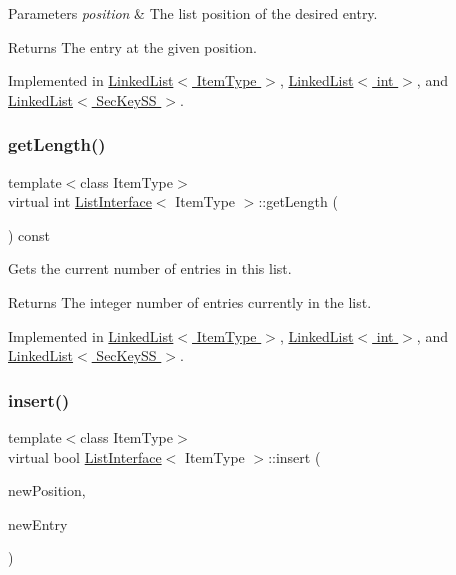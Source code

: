 \begin{DoxyParams}{Parameters}
{\em position} & The list position of the desired entry. \\
\hline
\end{DoxyParams}
\begin{DoxyReturn}{Returns}
The entry at the given position. 
\end{DoxyReturn}


Implemented in \hyperlink{classLinkedList_a341bfd7772c9d24d29eb7a7f3936915b}{Linked\+List$<$ Item\+Type $>$}, \hyperlink{classLinkedList_a341bfd7772c9d24d29eb7a7f3936915b}{Linked\+List$<$ int $>$}, and \hyperlink{classLinkedList_a341bfd7772c9d24d29eb7a7f3936915b}{Linked\+List$<$ Sec\+Key\+S\+S $>$}.

\mbox{\label{classListInterface_afc85695d4137f1e29ff02e179c9f3221}} 
\subsubsection{\texorpdfstring{get\+Length()}{getLength()}}
{\footnotesize\ttfamily template$<$class Item\+Type$>$ \\
virtual int \hyperlink{classListInterface}{List\+Interface}$<$ Item\+Type $>$\+::get\+Length (\begin{DoxyParamCaption}{ }\end{DoxyParamCaption}) const\hspace{0.3cm}{\ttfamily [pure virtual]}}

Gets the current number of entries in this list. \begin{DoxyReturn}{Returns}
The integer number of entries currently in the list. 
\end{DoxyReturn}


Implemented in \hyperlink{classLinkedList_a61d045ef6008b494a1a516ecc992c0e7}{Linked\+List$<$ Item\+Type $>$}, \hyperlink{classLinkedList_a61d045ef6008b494a1a516ecc992c0e7}{Linked\+List$<$ int $>$}, and \hyperlink{classLinkedList_a61d045ef6008b494a1a516ecc992c0e7}{Linked\+List$<$ Sec\+Key\+S\+S $>$}.

\mbox{\label{classListInterface_a5b2f86954a86172699a3495982c38e77}} 
\subsubsection{\texorpdfstring{insert()}{insert()}}
{\footnotesize\ttfamily template$<$class Item\+Type$>$ \\
virtual bool \hyperlink{classListInterface}{List\+Interface}$<$ Item\+Type $>$\+::insert (\begin{DoxyParamCaption}\item[{int}]{new\+Position,  }\item[{const Item\+Type \&}]{new\+Entry }\end{DoxyParamCaption})\hspace{0.3cm}{\ttfamily [pure virtual]}}

